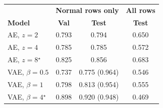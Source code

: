 \begin{tabular}{lccc}
\hline
& \multicolumn{2}{c}{\textbf{Normal rows only}} & \textbf{All rows} \\
\textbf{Model} & \textbf{Val} & \textbf{Test} & \textbf{Test} \\ \hline
AE, $z=2$ & 0.793 & 0.794 & 0.650 \\
AE, $z=4$ & 0.785 & 0.785 & 0.572 \\
AE, $z=8$$^\star$ & 0.825 & 0.856 & 0.683 \\
\hline
VAE, $\beta=0.5$ & 0.737 & 0.775 (0.964) & 0.546 \\
VAE, $\beta=1$ & 0.798 & 0.813 (0.954) & 0.555 \\
VAE, $\beta=4$$^\star$ & 0.898 & 0.920 (0.948) & 0.469 \\
\hline
\end{tabular}
